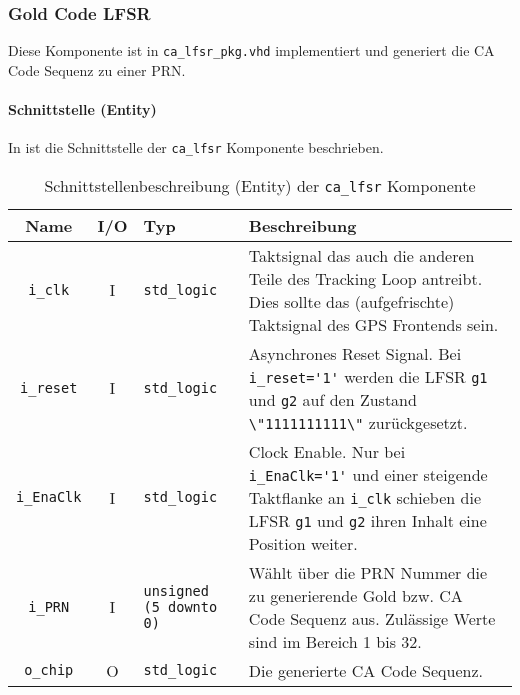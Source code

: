 \subsubsection{Gold Code LFSR}
Diese Komponente ist in  \lstinline$ca_lfsr_pkg.vhd$ implementiert und generiert die \gls{CA} Code Sequenz zu einer PRN.


\paragraph{Schnittstelle (Entity)}
In  ist die Schnittstelle der \lstinline$ca_lfsr$ Komponente beschrieben.

\begin{table}[htbp]
    \ttabbox
    {
        \caption[LFSR Schnittstelle]{Schnittstellenbeschreibung (Entity) der \lstinline$ca_lfsr$ Komponente}
        \label{TabCALFSR_Entity}
    }
    {
    \begin{tabular}{c c  p{2cm} p{6cm}}
        \toprule
        Name                    & I/O  & Typ                               & Beschreibung \\
        \midrule
        \lstinline$i_clk$       & I         & \lstinline$std_logic$             & Taktsignal das auch die anderen Teile des Tracking Loop antreibt. Dies sollte das (aufgefrischte) Taktsignal des GPS Frontends sein.\\
        \lstinline$i_reset$     & I         & \lstinline$std_logic$             & Asynchrones Reset Signal. Bei \lstinline$i_reset='1'$ werden die LFSR \lstinline$g1$ und \lstinline$g2$ auf den Zustand \lstinline$\"1111111111\"$ zurückgesetzt.\\
        \lstinline$i_EnaClk$    & I         & \lstinline$std_logic$             & Clock Enable. Nur bei \lstinline$i_EnaClk='1'$ und einer steigende Taktflanke an \lstinline$i_clk$ schieben die LFSR \lstinline$g1$ und \lstinline$g2$ ihren Inhalt eine Position weiter.\\
        \lstinline$i_PRN$       & I         & \lstinline$unsigned (5 downto 0)$ & Wählt über die PRN Nummer die zu generierende Gold bzw. \gls{CA} Code Sequenz aus. Zulässige Werte sind im Bereich 1 bis 32.\\
        \lstinline$o_chip$      & O         & \lstinline$std_logic$             & Die generierte \gls{CA} Code Sequenz.\\
        \bottomrule
    \end{tabular}
}
\end{table}

